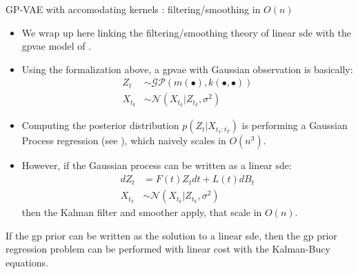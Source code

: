 \begin{frame}{GP-VAE with accomodating kernels : filtering/smoothing in $O(n)$}
    \begin{itemize}
        \item We wrap up here linking the filtering/smoothing theory of linear \gls{sde} with the \gls{gpvae} 
model of \cite{fortuin_gp-vae:_2020}.
        \item Using the formalization above, a \gls{gpvae} with Gaussian observation is basically:
            \begin{align}
                \label{gpvae gaussian observation}
                Z_t &\sim \mathcal{GP}(m(\bullet), k(\bullet, \bullet)) \\
                X_{t_k} &\sim \mathcal{N}(X_{t_k} \vert Z_{t_k}, \sigma^{2})
            \end{align}
        \item Computing the posterior distribution $p(Z_t \vert X_{t_1:t_T})$ is performing a Gaussian Process 
regression (see \cite{rasmussen_gaussian_2008}), which naively scales in $O(n^{3})$.
        \item However, if the Gaussian process can be written as a linear \gls{sde}:
            \begin{align}
                \label{gpvae linear sde form}
                dZ_t &= F(t)Z_t dt + L(t)dB_t \\
                X_{t_k} &\sim \mathcal{N}(X_{t_k} \vert Z_{t_k}, \sigma^{2})
            \end{align}
            then the Kalman filter and smoother apply, that scale in $O(n)$. 
    \end{itemize}
    \begin{tcolorbox}[colback=blue!5!white,colframe=black!75!black,title=GP Prior regression in $O(N)$ cost]
        If the \gls{gp} prior can be written as the solution to a linear \gls{sde}, then the \gls{gp} prior regression problem 
        can be performed with linear cost with the Kalman-Bucy equations.
    \end{tcolorbox}
\end{frame}